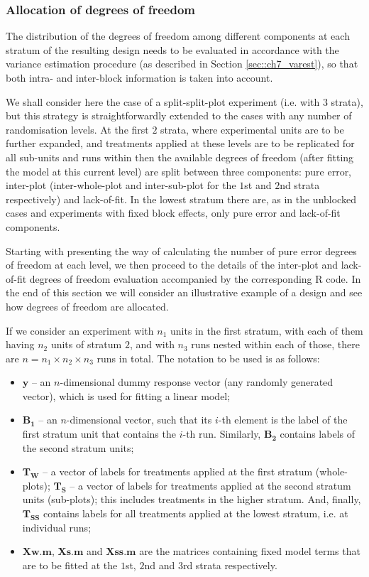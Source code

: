 \subsubsection*{Allocation of degrees of freedom}

The distribution of the degrees of freedom among different components at each stratum of the resulting design needs to be evaluated in accordance with the variance estimation procedure (as described in Section \ref{sec::ch7_varest}), so that both intra- and inter-block information is taken into account. 

We shall consider here the case of a split-split-plot experiment (i.e. with $3$ strata), but this strategy is straightforwardly extended to the cases with any number of randomisation levels. At the first $2$ strata, where experimental units are to be further expanded, and treatments applied at these levels are to be replicated for all sub-units and runs within then the available degrees of freedom (after fitting the model at this current level) are split between three components: pure error, inter-plot (inter-whole-plot and inter-sub-plot for the $1$st and $2$nd strata respectively) and lack-of-fit. In the lowest stratum there are, as in the unblocked cases and experiments with fixed block effects, only pure error and lack-of-fit components.

Starting with presenting the way of calculating the number of pure error degrees of freedom at each level, we then proceed to the details of the inter-plot and lack-of-fit degrees of freedom evaluation accompanied by the corresponding R code. In the end of this section we will consider an illustrative example of a design and see how degrees of freedom are allocated.

If we consider an experiment with $n_1$ units in the first stratum, with each of them having $n_2$ units of stratum $2$, and with $n_3$ runs nested within each of those, there are $n=n_1\times n_2\times n_3$ runs in total. The notation to be used is as follows:
\begin{itemize}
\item $\bm{y}$ -- an $n$-dimensional dummy response vector (any randomly generated vector), which is used for fitting a linear model;
\item $\bm{B_1}$ -- an $n$-dimensional vector, such that its $i$-th element is the label of the first stratum unit that contains the $i$-th run. Similarly, $\bm{B_2}$ contains labels of the second stratum units;
\item  $\bm{T_{W}}$ -- a vector of labels for treatments applied at the first stratum (whole-plots); $\bm{T_{S}}$ -- a vector of labels for treatments applied at the second stratum units (sub-plots); this includes treatments in the higher stratum. And, finally, $\bm{T_{SS}}$ contains labels for all treatments applied at the lowest stratum, i.e. at individual runs;
\item $\bm{Xw.m}$, $\bm{Xs.m}$ and $\bm{Xss.m}$ are the matrices containing fixed model terms that are to be fitted at the $1$st, $2$nd and $3$rd strata respectively.
\end{itemize}

